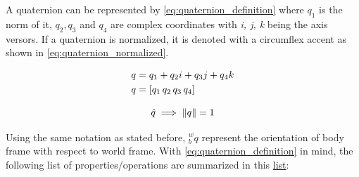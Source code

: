 A quaternion can be represented by \eqref{eq:quaternion_definition} where $q_1$ is the norm of it, $q_2, q_3$ and $q_4$ are complex coordinates with \textit{i, j, k} being the axis versors. If a quaternion is normalized, it is denoted with a circumflex accent as shown in \eqref{eq:quaternion_normalized}.

\begin{equation}
\centering
\begin{aligned}
q &=q_1+q_2i+q_3j+q_4k\\
q &= [q_1\, q_2\, q_3\, q_4]
\end{aligned}
\label{eq:quaternion_definition}
\end{equation}

\begin{equation}
\centering
\hat{q} \implies \|q\|=1
\label{eq:quaternion_normalized}
\end{equation}

Using the same notation as stated before, ${}^w_bq$ represent the orientation of body frame with respect to world frame. With \eqref{eq:quaternion_definition} in mind, the following list of properties/operations are summarized in this \hyperref[list:quaternion_operations]{list}:

